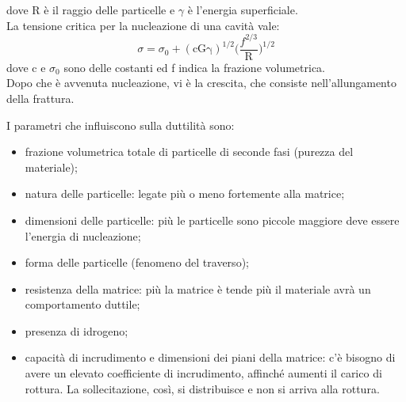 dove R è il raggio delle particelle e $\gamma$ è l’energia superficiale.\\
La tensione critica per la nucleazione di una cavità vale:
\begin{equation*}
    \sigma=\sigma_0 + (\mathrm{cG\gamma})^{1/2}\Bigg(\frac{f^{2/3}}{\mathrm{R}}\Bigg)^{1/2}
\end{equation*}
dove c e $\sigma_0$ sono delle costanti ed f indica la frazione volumetrica.\\
Dopo che è avvenuta nucleazione, vi è la crescita, che consiste nell’allungamento della frattura.

I parametri che influiscono sulla duttilità sono:
\begin{itemize}
    \item frazione volumetrica totale di particelle di seconde fasi (purezza del materiale);
    \item natura delle particelle: legate più o meno fortemente alla matrice;
    \item dimensioni delle particelle: più le particelle sono piccole maggiore deve essere l’energia di nucleazione;
    \item forma delle particelle (fenomeno del traverso);
    \item resistenza della matrice: più la matrice è tende più il materiale avrà un comportamento duttile;
    \item presenza di idrogeno;
    \item capacità di incrudimento e dimensioni dei piani della matrice: c’è bisogno di avere un elevato coefficiente di incrudimento, affinché aumenti il carico di rottura. La sollecitazione, così, si distribuisce e non si arriva alla rottura.
\end{itemize}

